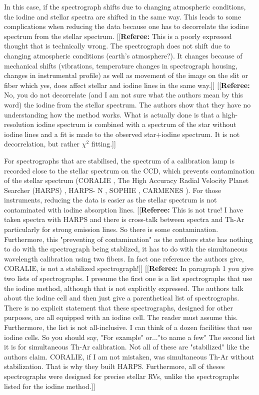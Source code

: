 \documentclass[11pt, oneside]{article}
\newcommand{\comment}[1]{{\color{red}[[\textbf{Referee: }#1]]}}
\begin{document}
In this case, if the spectrograph shifts due to changing atmospheric conditions, the iodine and stellar spectra are shifted in the same way. This leads to some complications when reducing the data because one has to decorrelate the iodine spectrum from the stellar spectrum. 
\comment{This is a poorly expressed thought that is technically wrong. The spectrograph does not shift due to changing atmospheric conditions (earth's atmosphere?). It changes because of mechanical shifts (vibrations, temperature changes in spectrograph housing, changes in instrumental profile) as well as movement of the image on the slit or fiber which yes, does affect stellar and iodine lines in the same way.}  
\comment{No, you do not decorrelate (and I am not sure what the authors mean by this word) the iodine from the stellar spectrum. The authors show that they have no understanding how the method works. What is actually done is that a high-resolution iodine spectrum is combined with a spectrum of the star without iodine lines and a fit is made to the observed star+iodine spectrum. It is not decorrelation, but rather $\chi^2$ fitting.}

For spectrographs that are stabilised, the spectrum of a calibration lamp is recorded close to the stellar spectrum on the CCD, which prevents contamination of the stellar spectrum (CORALIE \citep{Queloz-2000a}, The High Accuracy Radial Velocity Planet Searcher (HARPS) \citep{Mayor-2003}, HARPS- N \citep{Cosentino-2012}, SOPHIE \citep{Bouchy:2013aa}, CARMENES \citep{Quirrenbach:2014aa}). For those instruments, reducing the data is easier as the stellar spectrum is not contaminated with iodine absorption lines.
\comment{This is not true! I have taken spectra with HARPS and there is cross-talk between spectra and Th-Ar particularly for strong emission lines. So there is some contamination. Furthermore, this "preventing of contamination" as the authors state has nothing to do with the spectrograph being stablized, it has to do with the simultaneous wavelength calibration using two fibers. In fact one reference the authors give, CORALIE, is not a stabilized spectrograph!}
\comment{In paragraph 1 you give two lists of spectrographs. I presume the first one is a list spectrographs that use the iodine method, although that is not explicitly expressed. The authors talk about the iodine cell and then just give a parenthetical list of spectrographs. There is no explicit statement that these spectrographs, designed for other purposes, are all equipped with an iodine cell. The reader must assume this. Furthermore, the list is not all-inclusive. I can think of a dozen facilities that use iodine cells. So you should say, "For example" or..."to name a few"
The second list it is for simultaneous Th-Ar calibration. Not all of these are "stabilized" like the authors claim. CORALIE, if I am not mistaken, was simultaneous Th-Ar without stabilization. That is why they built HARPS. Furthermore, all of theses spectrographs were designed for precise stellar RVs, unlike the spectrographs listed for the iodine method.}
\end{document}
